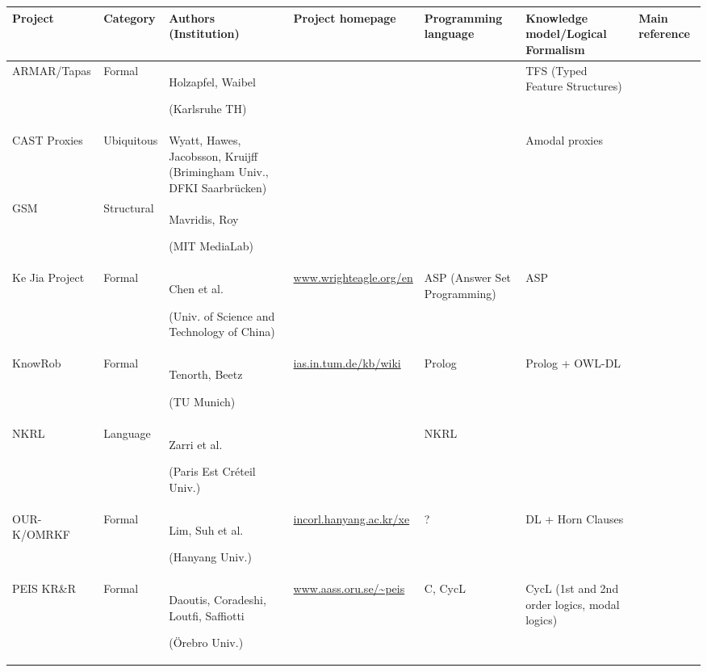 \begin{landscape}
\begin{table}\scriptsize
\begin{center}

\begin{tabular}{p{2.2cm}p{1.6cm}p{4cm}lp{2.4cm}p{3.4cm}p{1.5cm}}
\toprule
{\bf Project} & {\bf Category} & {\bf Authors (Institution)} & {\bf Project homepage} & {\bf Programming language} & {\bf Knowledge model/Logical Formalism} & Main reference \\
\midrule
ARMAR/Tapas & Formal & Holzapfel, Waibel \par (Karlsruhe TH) & & & TFS (Typed Feature Structures) & \cite{Holzapfel2008}\\
CAST Proxies & Ubiquitous & Wyatt, Hawes, Jacobsson, Kruijff (Brimingham Univ., DFKI Saarbrücken) & & & Amodal proxies & \cite{Jacobsson2008} \\
GSM & Structural & Mavridis, Roy \par (MIT MediaLab) & & & & \cite{Mavridis2006} \\
Ke Jia Project & Formal & Chen et al. \par (Univ. of Science and Technology of China) & \url{www.wrighteagle.org/en} & ASP (Answer Set Programming) & ASP & \cite{Chen2010} \\
{\sc KnowRob} & Formal & Tenorth, Beetz \par (TU Munich) & \url{ias.in.tum.de/kb/wiki} & {\sc Prolog} & {\sc Prolog} + OWL-DL &  \cite{Tenorth2009a} \\
NKRL & Language & Zarri et al. \par (Paris Est Créteil Univ.) & & NKRL & & \cite{Sabri2011} \\
OUR-K/OMRKF & Formal & Lim, Suh et al. \par (Hanyang Univ.) & \url{incorl.hanyang.ac.kr/xe} & ? & DL + Horn Clauses &  \cite{Lim2011, Suh2007} \\
PEIS KR\&R & Formal & Daoutis, Coradeshi, Loutfi, Saffiotti \par (Örebro Univ.) & \url{www.aass.oru.se/~peis} & {\sc C}, {\sc CycL} & CycL (1st and 2nd order logics, modal logics) & \cite{Daoutis2009} \\

\end{tabular}
\end{center}
\end{table}
\end{landscape}
